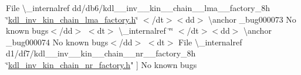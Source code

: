 \begin{DoxyRefList}
\+File \textbackslash{}\+\_\+internalref dd/db6/kdl\+\_\+\+\_\+inv\+\_\+\+\_\+kin\+\_\+\+\_\+chain\+\_\+\+\_\+lma\+\_\+\+\_\+factory\+\_\+8h \char`\"{}\mbox{\hyperlink{kdl__inv__kin__chain__lma__factory_8h}{kdl\+\_\+inv\+\_\+kin\+\_\+chain\+\_\+lma\+\_\+factory.\+h}}\char`\"{} $<$/dt$>$$<$dd$>$ \textbackslash{}anchor \+\_\+bug000073 No known bugs$<$/dd$>$ $<$dt$>$
 \textbackslash{}\+\_\+internalref  \char`\"{}\char`\"{} $<$/dt$>$$<$dd$>$ \textbackslash{}anchor \+\_\+bug000074 No known bugs$<$/dd$>$ $<$dt$>$
\+File \textbackslash{}\+\_\+internalref d1/df7/kdl\+\_\+\+\_\+inv\+\_\+\+\_\+kin\+\_\+\+\_\+chain\+\_\+\+\_\+nr\+\_\+\+\_\+factory\+\_\+8h \char`\"{}\mbox{\hyperlink{kdl__inv__kin__chain__nr__factory_8h}{kdl\+\_\+inv\+\_\+kin\+\_\+chain\+\_\+nr\+\_\+factory.\+h}}" ]\label{bug__bug000075}%
%
No known bugs
\end{DoxyRefList}